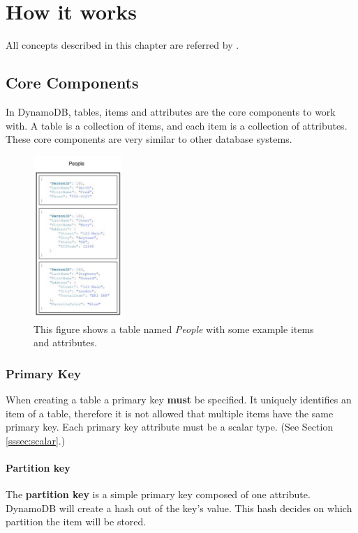 \chapter{How it works}
\label{cha:How it works}
All concepts described in this chapter are referred by \cite{AmazonWebServices2013}.

\section{Core Components}
In DynamoDB, tables, items and attributes are the core components to work with. A table is a collection of items, and each item is a collection of attributes. 
These core components are very similar to other database systems.

\begin{figure}
\centering
\includegraphics[width=0.3\textwidth]{images/dynamodb-basic-table.jpg}
\caption{This figure shows a table named \textit{People} with some example items and attributes. \cite{AmazonWebServices2013}}
\end{figure}

\subsection{Primary Key}
When creating a table a primary key \textbf{must} be specified. It uniquely identifies an item of a table, therefore it is not allowed that multiple items have the same primary key.
Each primary key attribute must be a scalar type. (See Section \ref{sssec:scalar}.)

\subsubsection{Partition key}
\label{sssec:partkey}
The \textbf{partition key} is a simple primary key composed of one attribute. DynamoDB will create a hash out of the key's value. This hash decides on which partition the item will be stored.

